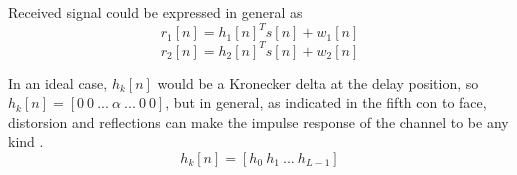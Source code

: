   Received signal could be expressed in general as
  \begin{dmath}
    r_1[n] = h_1[n]^T s[n] + w_1[n]
  \end{dmath}
  \begin{dmath}
    r_2[n] = h_2[n]^T s[n] + w_2[n]
  \end{dmath}
  
  In an ideal case, $h_k[n]$ would be a Kronecker delta at the delay position, so $h_k[n] = [0\ 0\ ...\ \alpha\ ...\ 0\ 0]$, but in general, as indicated in the fifth con to face, distorsion and reflections can make the impulse response of the channel to be any kind \cite{overview}.
  \begin{dmath}
    h_k[n] = [h_0\ h_1\ ...\ h_{L-1}]
  \end{dmath}
  
